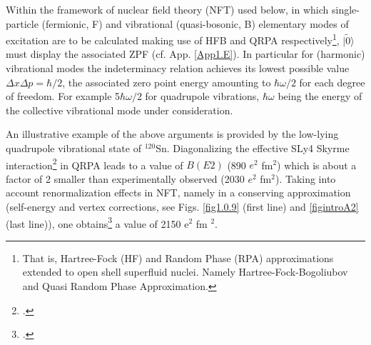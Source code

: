Within the framework of nuclear field theory (NFT) used below, in which single-particle (fermionic, F) and vibrational
(quasi-bosonic, B) elementary modes of excitation are to be calculated making use of HFB and QRPA
respectively\footnote{That is, Hartree-Fock (HF) and Random Phase (RPA) approximations extended to open shell superfluid nuclei. Namely Hartree-Fock-Bogoliubov and Quasi Random Phase Approximation.}, $|\tilde 0\rangle  $ must display the associated ZPF (cf. App. \ref{App1.E}). In particular for (harmonic) vibrational modes the indeterminacy relation achieves its lowest possible value 
$\Delta x \Delta p = \hbar/2$, the associated zero point energy amounting to $\hbar \omega/2$
for each degree of freedom. For example 5$\hbar \omega/2$ for quadrupole vibrations, 
$\hbar \omega$ being the energy of the collective vibrational mode under consideration. 




An illustrative example of the above arguments is provided by the low-lying quadrupole vibrational state of $^{120}$Sn. 
Diagonalizing the effective SLy4 Skyrme interaction\footnote{\cite{Ring:80}.} in QRPA leads to a value of $B(E2)$
(890 $e^2$ fm$^2$) which is about a factor of 2 smaller than experimentally observed (2030 $e^2$ fm$^2$). 
Taking into account  renormalization effects in NFT, 
namely in a conserving  approximation (self-energy and vertex corrections, see Figs. \ref{fig1.0.9} (first line) and \ref{figintroA2} (last line)),   one obtains\footnote{\cite{Barranco:04}.} a value of 2150 e$^2$ fm $^2$. 


